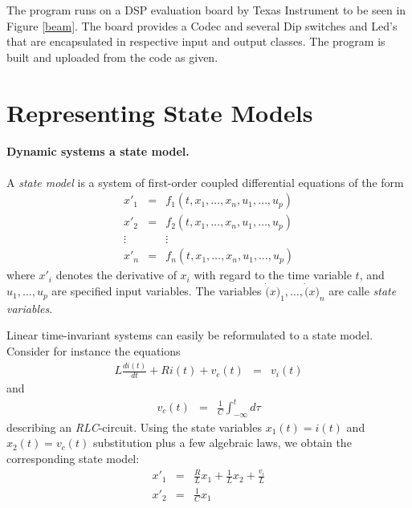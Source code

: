 The program runs on a DSP evaluation board by Texas Instrument to be seen in Figure 
\ref{beam}. The board provides
a Codec and several Dip switches and Led's that are encapsulated in respective
input and output classes. The program is built and uploaded from the code as given.

\section{Representing State Models}

\paragraph{Dynamic systems a state model.} A \emph{state model} is a system of first-order coupled differential equations of the form
\begin{eqnarray*}
x'_{1} & = & f_{1}(t,x_{1},\ldots,x_{n},u_{1},\ldots,u_{p})\\
x'_{2} & = & f_{2}(t,x_{1},\ldots,x_{n},u_{1},\ldots,u_{p})\\
\vdots      &   & \vdots \\
x'_{n} & = & f_{n}(t,x_{1},\ldots,x_{n},u_{1},\ldots,u_{p})
\end{eqnarray*}
where $x'_{i}$ denotes the derivative of $x_{i}$ with regard to the time variable $t$, and $u_{1},\ldots,u_{p}$ are specified input variables. The variables $\dot(x)_{1},\ldots,\dot(x)_{n}$ are calle \emph{state variables}.


Linear time-invariant systems can easily be reformulated to a state model. Consider for instance the equations
\begin{eqnarray*}
L\frac{di(t)}{dt} +  Ri(t) + v_{c}(t)& = & v_{i}(t)
\end{eqnarray*}
and
\begin{eqnarray*}
v_{c}(t)& = & \frac{1}{C}\int_{-\infty}^td\tau
\end{eqnarray*}
describing an \textit{RLC}-circuit. Using the state variables $x_{1}(t) = i(t)$
 and $x_{2}(t) = v_{c}(t)$ substitution plus a few algebraic laws, we obtain
  the corresponding state model:
\begin{eqnarray*}
x'_{1} & = & \frac{R}{L}x_{1} + \frac{1}{L}x_{2} + \frac{v_{i}}{L}\\
x'_{2} & = & \frac{1}{C}x_{1}
\end{eqnarray*}

